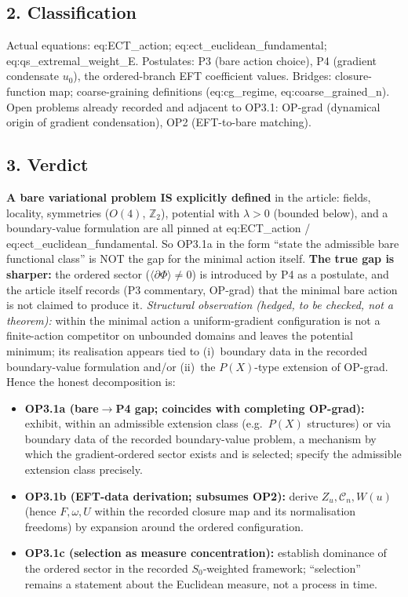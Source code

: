 \subsection*{2. Classification}
Actual equations: eq:ECT\_action;
eq:ect\_euclidean\_fundamental; eq:qs\_extremal\_weight\_E.
Postulates: P3 (bare action choice), P4 (gradient condensate
$u_0$), the ordered-branch EFT coefficient values.
Bridges: closure-function map; coarse-graining definitions
(eq:cg\_regime, eq:coarse\_grained\_n).
Open problems already recorded and adjacent to OP3.1:
OP-grad (dynamical origin of gradient condensation), OP2
(EFT-to-bare matching).

\subsection*{3. Verdict}
\textbf{A bare variational problem IS explicitly defined} in the
article: fields, locality, symmetries ($O(4)$, $\mathbb Z_2$),
potential with $\lambda>0$ (bounded below), and a boundary-value
formulation are all pinned at eq:ECT\_action /
eq:ect\_euclidean\_fundamental.
So OP3.1a in the form ``state the admissible bare functional
class'' is NOT the gap for the minimal action itself.
\textbf{The true gap is sharper:} the ordered sector
($\langle\partial\Phi\rangle\neq0$) is introduced by P4 as a
postulate, and the article itself records (P3 commentary, OP-grad)
that the minimal bare action is not claimed to produce it.
\emph{Structural observation (hedged, to be checked, not a
theorem):} within the minimal action a uniform-gradient
configuration is not a finite-action competitor on unbounded
domains and leaves the potential minimum; its realisation appears
tied to (i)~boundary data in the recorded boundary-value
formulation and/or (ii)~the $P(X)$-type extension of OP-grad.
Hence the honest decomposition is:
\begin{itemize}
\item \textbf{OP3.1a (bare$\to$P4 gap; coincides with completing
  OP-grad):} exhibit, within an admissible extension class (e.g.\
  $P(X)$ structures) or via boundary data of the recorded
  boundary-value problem, a mechanism by which the gradient-ordered
  sector exists and is selected; specify the admissible extension
  class precisely.
\item \textbf{OP3.1b (EFT-data derivation; subsumes OP2):} derive
  $Z_u,\mathcal C_n,W(u)$ (hence $F,\omega,U$ within the recorded
  closure map and its normalisation freedoms) by expansion around
  the ordered configuration.
\item \textbf{OP3.1c (selection as measure concentration):}
  establish dominance of the ordered sector in the recorded
  $S_0$-weighted framework; ``selection'' remains a statement about
  the Euclidean measure, not a process in time.
\end{itemize}

